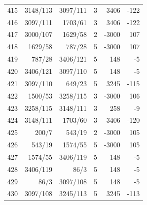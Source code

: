 \documentclass[11pt,a4paper]{article}
\begin{document}
\begin{minipage}[t]{.49\linewidth}
\begin{tabular*}{\linewidth}{@{}r@{\extracolsep{\fill}}rrrrr@{}}
415 & 3148/113 & 3097/111 & 3 & 3406 & -122\\
416 & 3097/111 & 1703/61 & 3 & 3406 & -122\\
417 & 3000/107 & 1629/58 & 2 & -3000 & 107\\
418 & 1629/58 & 787/28 & 5 & -3000 & 107\\
419 & 787/28 & 3406/121 & 5 & 148 & -5\\
420 & 3406/121 & 3097/110 & 5 & 148 & -5\\
421 & 3097/110 & 649/23 & 5 & 3245 & -115\\
422 & 1500/53 & 3258/115 & 3 & -3000 & 106\\
423 & 3258/115 & 3148/111 & 3 & 258 & -9\\
424 & 3148/111 & 1703/60 & 3 & 3406 & -120\\
425 & 200/7 & 543/19 & 2 & -3000 & 105\\
426 & 543/19 & 1574/55 & 5 & -3000 & 105\\
427 & 1574/55 & 3406/119 & 5 & 148 & -5\\
428 & 3406/119 & 86/3 & 5 & 148 & -5\\
429 & 86/3 & 3097/108 & 5 & 148 & -5\\
430 & 3097/108 & 3245/113 & 5 & 3245 & -113\\
\bottomrule\end{tabular*}\end{minipage}\par
\clearpage
{}\par\vspace{4pt}
\end{document}
